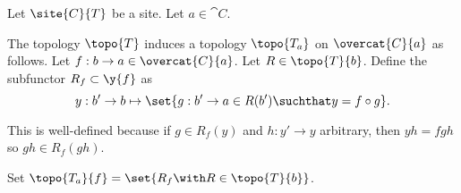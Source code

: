 \begin{definition}
Let $\site{C}{T}$ be a site.
Let $a \in \cat{C}$.

The topology $\topo{T}$ induces a topology $\topo{T_a}$
on $\overcat{C}{a}$ as follows.
Let $f : b \rightarrow a \in \overcat{C}{a}$.
Let $R \in \topo{T}{b}$.
Define the subfunctor $R_f \subset \y{f}$ as
\[ y : b' \rightarrow b 
	\mapsto \set{g: b' \rightarrow a \in R(b') \suchthat y = f \circ g}.
\]

This is well-defined because if $g\in R_f(y)$ 
and $h:y'\rightarrow y$ arbitrary, 
then $yh=fgh$ so $gh \in R_f(gh)$.

Set $\topo{T_a}{f} = \set{ R_f \with R \in \topo{T}{b}}$.





\end{definition}